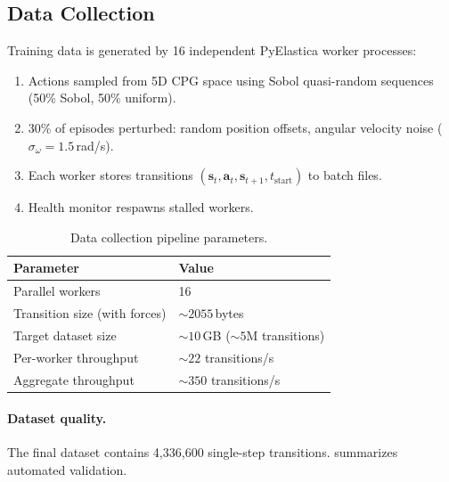 \documentclass[11pt]{article}
\begin{document}
\subsection{Data Collection}
\label{sec:surrogate:data}

Training data is generated by 16 independent PyElastica worker processes:

\begin{enumerate}
  \item Actions sampled from 5D CPG space using Sobol quasi-random sequences (50\% Sobol, 50\% uniform).
  \item 30\% of episodes perturbed: random position offsets, angular velocity noise ($\sigma_\omega = 1.5$\,rad/s).
  \item Each worker stores transitions $(\mathbf{s}_t, \mathbf{a}_t, \mathbf{s}_{t+1}, t_{\text{start}})$ to batch files.
  \item Health monitor respawns stalled workers.
\end{enumerate}

\begin{table}[H]
  \centering
  \small
  \renewcommand{\arraystretch}{1.3}
  \caption{Data collection pipeline parameters.}
  \label{tab:data-collection}
  \begin{tabular}{@{}ll@{}}
    \toprule
    \textbf{Parameter} & \textbf{Value} \\
    \midrule
    Parallel workers & 16 \\
    Transition size (with forces) & ${\sim}2055$\,bytes \\
    Target dataset size & ${\sim}10$\,GB (${\sim}5$M transitions) \\
    Per-worker throughput & ${\sim}22$ transitions/s \\
    Aggregate throughput & ${\sim}350$ transitions/s \\
    \bottomrule
  \end{tabular}
\end{table}

\paragraph{Dataset quality.}
The final dataset contains 4,336,600 single-step transitions.
 summarizes automated validation.
\end{document}
